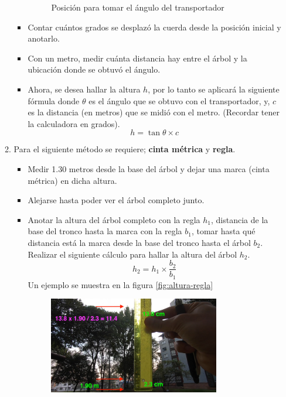\documentclass{article}
\begin{document}
\begin{enumerate}
\begin{enumerate}
\begin{itemize}
\begin{figure}[H]
                          \caption{Posición para tomar el ángulo del transportador}
                          \label{fig:transportador-altura}
                        \end{figure}
                  \item Contar cuántos grados se desplazó la cuerda desde la posición inicial y anotarlo.
                  \item Con un metro, medir cuánta distancia hay entre el árbol y la ubicación donde se obtuvó el ángulo.
                  \item Ahora, se desea hallar la altura \(h\), por lo tanto se aplicará la siguiente fórmula donde \(\theta\) es el ángulo que se obtuvo con el transportador, y, \(c\) es la distancia (en metros) que se midió con el metro. (Recordar tener la calculadora en grados).
                        \[
                        h = \tan{\theta} \times c
                        \]
                \end{itemize}
          \item Para el siguiente método se requiere; \textbf{cinta métrica} y \textbf{regla}.
                \begin{itemize}
                  \item Medir 1.30 metros desde la base del árbol y dejar una marca (cinta métrica) en dicha altura.
                  \item Alejarse hasta poder ver el árbol completo junto.
                  \item Anotar la altura del árbol completo con la regla \(h_{1}\), distancia de la base del tronco hasta la marca con la regla \(b_{1}\), tomar hasta qué distancia está la marca desde la base del tronco hasta el árbol \(b_{2}\). Realizar el siguiente cálculo para hallar la altura del árbol \(h_{2}\).
                        \[
                        h_{2} = h_{1} \times \frac{b_{2}}{b_{1}}
                        \]
                        Un ejemplo se muestra en la figura \ref{fig:altura-regla}
                        \begin{figure}[H]
                          \centering
                          \includegraphics[width=0.8\textwidth]{img/Altura4.png}

\end{figure}
\end{itemize}
\end{enumerate}
\end{enumerate}
\end{document}
